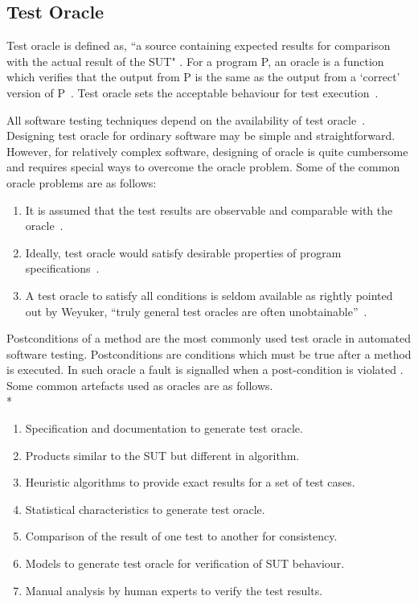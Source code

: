 \subsection{Test Oracle}
Test oracle is defined as, ``a source containing expected results for comparison with the actual result of the SUT" \cite{ahmed2010software}. For a program P, an oracle is a function which verifies that the output from P is the same as the output from a ‘correct’ version of P~\cite{howden1986functional}. Test oracle sets the acceptable behaviour for test execution~\cite{baresi2001test}. 

All software testing techniques depend on the availability of test oracle~\cite{gaudel2010software}. Designing test oracle for ordinary software may be simple and straightforward. However, for relatively complex software, designing of oracle is quite cumbersome and requires special ways to overcome the oracle problem. Some of the common oracle problems are as follows:

\begin{enumerate}
\item It is assumed that the test results are observable and comparable with the oracle~\cite{weyuker1982testing}.
\item Ideally, test oracle would satisfy desirable properties of program specifications~\cite{baresi2001test}.
\item A test oracle to satisfy all conditions is seldom available as rightly pointed out by Weyuker, ``truly general test oracles are often unobtainable''~\cite{weyuker1982testing}. 
\end{enumerate}
\bigskip
Postconditions of a method are the most commonly used test oracle in automated software testing. Postconditions are conditions which must be true after a method is executed. In such oracle a fault is signalled when a post-condition is violated \cite{meyer2009programs}. Some common artefacts used as oracles are as follows.\\*
\begin{enumerate}
\item Specification and documentation to generate test oracle. 
\item Products similar to the SUT but different in algorithm. %
\item Heuristic algorithms to provide exact results for a set of test cases. %
\item Statistical characteristics to generate test oracle. %
\item Comparison of the result of one test to another for consistency. %
\item Models to generate test oracle for verification of SUT behaviour. %
\item Manual analysis by human experts to verify the test results. %
\end{enumerate}

